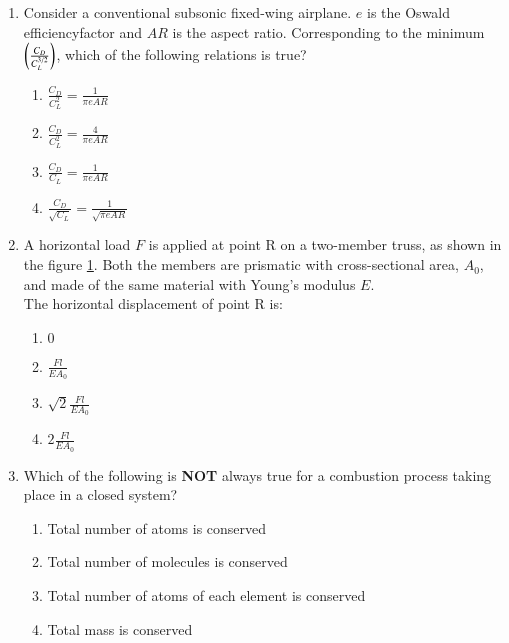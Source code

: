 \documentclass[journal]{IEEEtran}
\begin{document}
\begin{enumerate}
    \item Consider a conventional subsonic fixed-wing airplane. $e$ is the Oswald efficiencyfactor and $AR$ is the aspect ratio. Corresponding to the minimum $\left(\frac{C_D}{C_L^{3/2}}\right)$, which of the following relations is true?
    \begin{enumerate}
        \item $\frac{C_D}{C_L^2} = \frac{1}{\pi e A R}$
        \item $\frac{C_D}{C_L^2} = \frac{4}{\pi e A R}$
        \item $\frac{C_D}{C_L} = \frac{1}{\pi e A R}$
        \item $\frac{C_D}{\sqrt{C_L}} = \frac{1}{\sqrt{\pi e A R}}$
    \end{enumerate}


    \item A horizontal load $F$ is applied at point R on a two-member truss, as shown in the figure \ref{41fig}. Both the members are prismatic with cross-sectional area, $A_0$, and made of the same material with Young's modulus $E$.\\The horizontal displacement of point R is:
        \begin{figure}[H]
            \centering
            
            \caption{}
            \label{41fig}
        \end{figure}

        \begin{enumerate}
            \item $0$
            \item $\frac{Fl}{E A_0}$
            \item $\sqrt{2}\frac{Fl}{E A_0}$
            \item $2\frac{Fl}{E A_0}$
        \end{enumerate}

    \item Which of the following is \textbf{NOT} always true for a combustion process taking place in a closed system?
        \begin{enumerate}
            \item Total number of atoms is conserved
            \item Total number of molecules is conserved
            \item Total number of atoms of each element is conserved
            \item Total mass is conserved
        \end{enumerate}


\end{enumerate}
\end{document}
